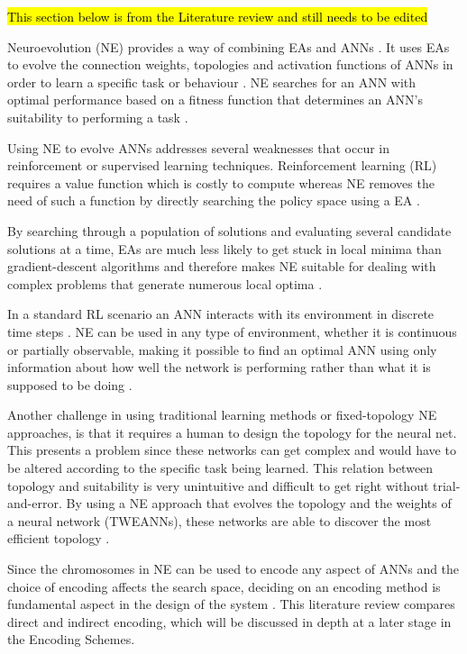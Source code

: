 \documentclass[conference]{IEEEtran}
\begin{document}
\hl{This section below is from the Literature review and still needs to be edited}

Neuroevolution (NE) provides a way of combining EAs and ANNs \cite{RefWorks:31}. It uses EAs to evolve the connection weights, topologies and activation functions of ANNs in order to learn a specific task or behaviour \cite{gomez1999solving}. NE searches for an ANN with optimal performance based on a fitness function that determines an ANN's suitability to performing a task \cite{RefWorks:31}.

Using NE to evolve ANNs addresses several weaknesses that occur in reinforcement or supervised learning techniques. Reinforcement learning (RL) requires a value function which is costly to compute whereas NE removes the need of such a function by directly searching the policy space using a EA \cite{RefWorks:32}. 

By searching through a population of solutions and evaluating several candidate solutions at a time, EAs are much less likely to get stuck in local minima than gradient-descent algorithms and therefore makes NE suitable for dealing with complex problems that generate numerous local optima \cite{gomez2001neuro,RefWorks:1}.

In a standard RL scenario an ANN interacts with its environment in discrete time steps \cite{igel2003neuroevolution}. NE can be used in any type of environment, whether it is continuous or partially observable, making it possible to find an optimal ANN using only information about how well the network is performing rather than what it is supposed to be doing \cite{Miikkulainen:2010:ENN:1830761.1830902}. 

Another challenge in using traditional learning methods or fixed-topology NE approaches, is that it requires a human to design the topology for the neural net. This presents a problem since these networks can get complex and would have to be altered according to the specific task being learned. This relation between topology and suitability is very unintuitive and difficult to get right without trial-and-error. By using a NE approach that evolves the topology and the weights of a neural network (TWEANNs), these networks are able to discover the most efficient topology \cite{RefWorks:31}.

Since the chromosomes in NE can be used to encode any aspect of ANNs and the choice of encoding affects the search space, deciding on an encoding method is fundamental aspect in the design of the system \cite{RefWorks:31}. This literature review compares direct and indirect encoding, which will be discussed in depth at a later stage in the Encoding Schemes.
\end{document}
